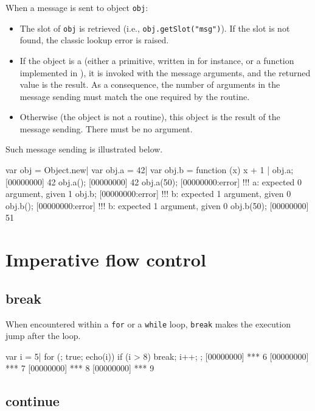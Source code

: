 When a message  is sent to object \lstinline|obj|:

\begin{itemize}
\item The  slot of \lstinline|obj| is retrieved (i.e.,
  \lstinline|obj.getSlot("msg")|). If the slot is not found, the
  classic lookup error is raised.
\item If the object is a  (either a primitive, written in
  \Cxx for instance, or a function implemented in \us), it is invoked
  with the message arguments, and the returned value is the result. As
  a consequence, the number of arguments in the message sending must
  match the one required by the routine.
\item Otherwise (the object is not a routine), this object is the
  result of the message sending. There must be no argument.
\end{itemize}

Such message sending is illustrated below.

\begin{urbiscript}
var obj = Object.new|
var obj.a = 42|
var obj.b = function (x) { x + 1 }|
obj.a;
[00000000] 42
obj.a();
[00000000] 42
obj.a(50);
[00000000:error] !!! a: expected 0 argument, given 1
obj.b;
[00000000:error] !!! b: expected 1 argument, given 0
obj.b();
[00000000:error] !!! b: expected 1 argument, given 0
obj.b(50);
[00000000] 51
\end{urbiscript}

\section{Imperative flow control}

\subsection{break}

When encountered within a \lstinline|for| or a \lstinline|while| loop,
\lstinline|break| makes the execution jump after the loop.

\begin{urbiscript}
var i = 5|
for (; true; echo(i))
{
  if (i > 8)
    break;
  i++;
};
[00000000] *** 6
[00000000] *** 7
[00000000] *** 8
[00000000] *** 9
\end{urbiscript}

\subsection{continue}

